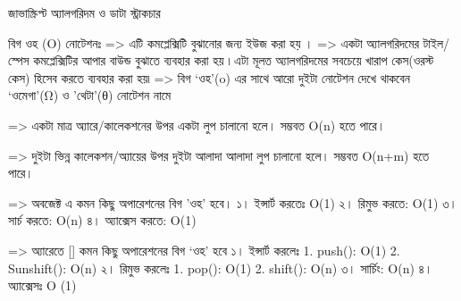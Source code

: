          জাভাস্ক্রিপ্ট অ্যালগরিদম ও ডাটা স্ট্রাকচার

    বিগ ওহ (O) নোটেশনঃ
=> এটি কমপ্লেক্সিটি বুঝানোর জন্য ইউজ করা হয় ।
=> একটা অ্যালগরিদমের টাইল/স্পেস কমপ্লেক্সিটির আপার বাউন্ড বুঝাতে ব্যবহার করা হয় ৷ 
   এটা মূলত অ্যালগরিদমের সবচেয়ে খারাপ কেস(ওরস্ট কেস) হিসেব করতে ব্যবহার করা হয়৷
=> বিগ ‘ওহ’(o) এর সাথে আরো দুইটা নোটেশন দেখে থাকবেন ‘ওমেগা’(Ω) ও
   'থেটা’(θ) নোটেশন নামে



=> একটা মাত্র অ্যারে/কালেকশনের উপর একটা লুপ চালানো হলে।
    সম্ভবত O(n) হতে পারে।


=> দুইটা ভিন্ন কালেকশন/অ্যায়ের উপর দুইটা আলাদা আলাদা লুপ চালানো হলে।
    সম্ভবত O(n+m) হতে পারে।


=> অবজেক্ট {} এ কমন কিছু অপারেশনের বিগ 'ওহ' হবে।
    ১। ইন্সার্ট করতেঃ O(1)
    ২। রিমুভ করতে: O(1)
    ৩। সার্চ করতে: O(n)
    ৪। অ্যাক্সেস করতে: O(1)


=> অ্যারেতে [] কমন কিছু অপারেশনের বিগ ‘ওহ’ হবে 
    ১। ইন্সার্ট করলেঃ
        1. push(): O(1)
        2. Sunshift(): O(n)
    ২। রিমুভ করলেঃ
        1. pop(): O(1)
        2. shift(): O(n)
    ৩। সার্চিং: O(n)
    ৪। অ্যাক্সেসঃ O (1)


